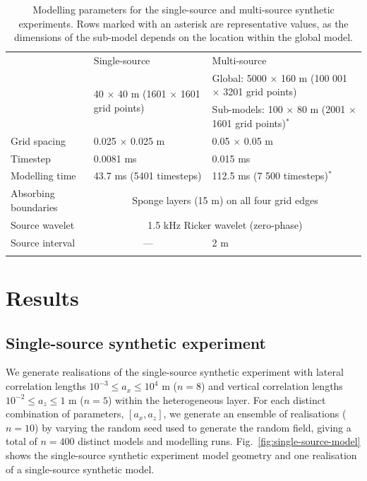 \documentclass[se,manuscript]{copernicus}
\begin{document}
\begin{table}
    \caption{Modelling parameters for the single-source and multi-source synthetic experiments. Rows marked with an asterisk are representative values, as the dimensions of the sub-model depends on the location within the global model.}
    \label{table:modelling-parameters}
    \begin{tabular}{lll}
        \tophline
        & Single-source & Multi-source \\
        \middlehline
        \multirow{2}{*}{Model dimensions} & \multirow{2}{*}{40 $\times$ 40 \unit{m} (1601 $\times$ 1601 grid points)} & Global: 5000 $\times$ 160 \unit{m} (100 001 $\times$ 3201 grid points) \\
        & & Sub-models: 100 $\times$ 80 \unit{m} (2001 $\times$ 1601 grid points)$^*$ \\
        Grid spacing & 0.025 $\times$ 0.025 \unit{m} & 0.05 $\times$ 0.05 \unit{m} \\
        Timestep & 0.0081 \unit{ms} & 0.015 \unit{ms}\\
        Modelling time & 43.7 \unit{ms} (5401 timesteps) & 112.5 \unit{ms} (7 500 timesteps)$^*$ \\
        Absorbing boundaries & \multicolumn{2}{c}{Sponge layers (15 \unit{m}) on all four grid edges} \\
        Source wavelet & \multicolumn{2}{c}{1.5 \unit{kHz} Ricker wavelet (zero-phase)} \\
        Source interval & \multicolumn{1}{c}{---} & 2 \unit{m} \\
        \bottomhline
    \end{tabular}
\end{table}

\section{Results}

\subsection{Single-source synthetic experiment}
\label{sec:single-source-results}
We generate realisations of the single-source synthetic experiment with lateral correlation lengths $10^{-3} \leq a_x \leq 10^4$ \unit{m} ($n=8$) and vertical correlation lengths $10^{-2} \leq a_z \leq 1$ \unit{m} ($n=5$) within the heterogeneous layer.
For each distinct combination of parameters, $[a_x, a_z]$, we generate an ensemble of realisations ($n=10$) by varying the random seed used to generate the random field, giving a total of $n=400$ distinct models and modelling runs.
Fig.~\ref{fig:single-source-model} shows the single-source synthetic experiment model geometry and one realisation of a single-source synthetic model.
\end{document}
